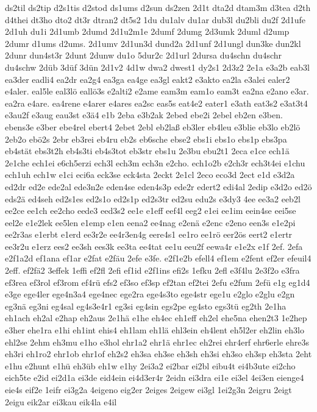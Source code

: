 {ds2til
ds2tip
d2s1tis
d2stod
ds1ums
d2sun
ds2zen
2d1t
dta2d
dtam3m
d3tea
d2th
d4thei
dt3ho
dto2
dt3r
dtran2
dt5s2
1du
du1alv
du1ar
dub3l
du2bli
du2f
2d1ufe
2d1uh
du1i
2d1umb
2dumd
2d1u2m1e
2dumf
2dumg
2d3umk
2duml
d2ump
2dumr
d1ums
d2ums.
2d1umv
2d1un3d
dund2a
2d1unf
2d1ungl
dun3ke
dun2kl
2dunr
dun4st3r
2dunt
2dunw
du1o
5dur2c
2d1url
2dursa
du4schn
du4schr
du4schw
2düb
3düf
3dün
2d1v2
4d1w
dwa2
dwest1
dy2s1
2d3z2
2e1a
e3a2b
eab3l
ea3der
eadli4
ea2dr
ea2g4
ea3ga
ea4ge
ea3gl
eakt2
e3akto
ea2la
e3alei
ealer2
e4aler.
eal5le
eal3lö
eallö3s
e2alti2
e2ame
eam3m
eam1o
eam3t
ea2na
e2ano
e3ar.
ea2ra
e4are.
ea4rene
e4arer
e4ares
ea2sc
eas5s
eat4e2
eater1
e3ath
eat3s2
e3at3t4
e3au2f
e3aug
eau3st
e3ä4
e1b
2eba
e3b2ak
2ebed
ebe2i
2ebel
eb2en
e3ben.
ebens3e
e3ber
ebe4rel
ebert4
2ebet
2ebl
eb2laß
eb3ler
eb4leu
e3blie
eb3lo
eb2lö
2eb2o
ebö2s
2ebr
eb3rei
eb4ru
eb2s
eb6sche
ebse2
ebs1i
ebs1o
ebs1p
ebs3pa
eb4stät
ebs3t2h
eb4s3ti
eb4s3tot
eb3str
ebs1u
2e3bu
ebu2t1
2eca
e1ce
ech1ä
2e1che
ech1ei
e6ch5erzi
ech3l
ech3m
ech3n
e2cho.
ech1o2b
e2ch3r
ech3t4ei
e1chu
ech1uh
ech1w
e1ci
eci6a
eck3se
eck4sta
2eckt
2e1cl
2eco
eco3d
2ect
e1d
e3d2a
ed2dr
ed2e
ede2al
ede3n2e
eden4se
eden4s3p
ede2r
edert2
edi4al
2edip
e3d2o
ed2ö
eds2ä
ed4seh
ed2s1es
ed2s1o
ed2s1p
ed2s3tr
ed2su
edu2s
e3dy3
4ee
ee3a2
eeb2l
ee2ce
ee1ch
ee2cho
eede3
eed3s2
ee1e
e1eff
eef4l
eeg2
e1ei
ee1im
eein4se
eei5se
eel2e
e1e2lek
ee5len
e1emp
e1en
eena2
ee4nag
e2enä
e2enc
e2eno
een3s
e1e2pi
ee2r3as
e1erbt
e1erd
ee3r2e
ee4r3en4g
eere4s1
ee1ro
ee1rö
eer2ös
eert2
e1ertr
ee3r2u
e1erz
ees2
ee3sh
ees3k
ee3ta
ee4tat
ee1u
eeu2f
eewa4r
e1e2x
e1f
2ef.
2efa
e2f1a2d
ef1ana
ef1ar
e2fat
e2fäu
2efe
e3fe.
e2f1e2b
efell4
ef1em
e2fent
ef2er
efeuil4
2eff.
ef2fä2
3effek
1effi
ef2fl
2efi
ef1id
e2f1ins
efi2s
1efku
2efl
e3f4lu
2e3f2o
e3fra
ef3rea
ef3rol
ef3rom
ef4rü
efs2
ef3so
ef3sp
ef2tan
ef2tei
2efu
e2fum
2efü
e1g
eg1d4
e3ge
ege4ler
ege4n3a4
ege4nec
ege2ra
ege4s3to
ege4str
ege1u
e2glo
e2glu
e2gn
eg3nä
eg3ni
eg4sal
eg4s3e4r1
eg3si
eg4sin
egs2pe
eg4sto
egs3tü
eg2th
2e1ha
eh1ach
eh2al
e2hap
eh2aus
2e1hä
e1he
eh4ec
eh1eff
eh2el
ehe5na
ehen2t3
1e2hep
e3her
ehe1ra
e1hi
eh1int
ehis4
eh1lam
eh1lä
ehl3ein
eh4lent
eh5l2er
eh2lin
eh3lo
ehl2se
2ehm
eh3mu
e1ho
e3hol
ehr1a2
ehr1ä
ehr1ec
eh2rei
ehr4erf
ehr6erle
ehre3s
eh3ri
eh1ro2
ehr1ob
ehr1of
eh2s2
eh3sa
eh3se
eh3sh
eh3si
eh3so
eh3sp
eh3sta
2eht
e1hu
e2hunt
e1hü
eh3üb
eh1w
e1hy
2ei3a2
ei2bar
ei2bl
eibu4t
ei4b3ute
ei2cho
eich5te
e2id
ei2d1a
ei3de
eid4ein
ei4d3er4r
2eidn
ei3dra
ei1e
ei3el
4ei3en
eienge4
eie4s
eif2e
1eifr
ei3g2a
4eigeno
eig2er
2eiges
2eigew
ei3gl
1ei2g3n
2eigru
2eigt
2eigu
eik2ar
ei3kau
eik4la
e4il
}
